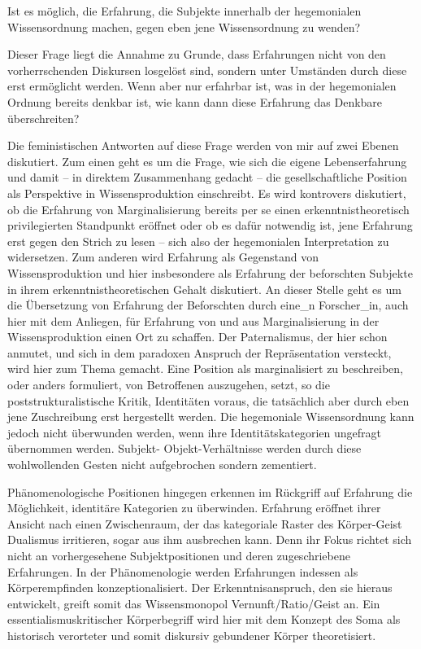 Ist es möglich, die Erfahrung, die Subjekte innerhalb der hegemonialen
Wissensordnung machen, gegen eben jene Wissensordnung zu wenden?

Dieser Frage
liegt die Annahme zu Grunde, dass Erfahrungen nicht von den vorherrschenden
Diskursen losgelöst sind, sondern unter Umständen durch diese erst ermöglicht
werden. Wenn aber nur erfahrbar ist, was in der hegemonialen Ordnung bereits
denkbar ist, wie kann dann diese Erfahrung das Denkbare überschreiten?

Die
feministischen Antworten auf diese Frage werden von mir auf zwei Ebenen
diskutiert. Zum einen geht es um die Frage, wie sich die eigene Lebenserfahrung
und damit – in direktem Zusammenhang gedacht – die gesellschaftliche Position
als Perspektive in Wissensproduktion einschreibt. Es wird kontrovers diskutiert,
ob die Erfahrung von Marginalisierung bereits per se einen erkenntnistheoretisch
privilegierten Standpunkt eröffnet oder ob es dafür notwendig ist, jene
Erfahrung erst gegen den Strich zu lesen – sich also der hegemonialen
Interpretation zu widersetzen. Zum anderen wird Erfahrung als Gegenstand von
Wissensproduktion und hier insbesondere als Erfahrung der beforschten Subjekte
in ihrem erkenntnistheoretischen Gehalt diskutiert. An dieser Stelle geht es um
die Übersetzung von Erfahrung der Beforschten durch eine\_n Forscher\_in, auch
hier mit dem Anliegen, für Erfahrung von und aus Marginalisierung in der
Wissensproduktion einen Ort zu schaffen. Der Paternalismus, der hier schon
anmutet, und sich in dem paradoxen Anspruch der Repräsentation versteckt, wird
hier zum Thema gemacht. Eine Position als marginalisiert zu beschreiben, oder
anders formuliert, von Betroffenen auszugehen, setzt, so die
poststrukturalistische Kritik, Identitäten voraus, die tatsächlich aber durch
eben jene Zuschreibung erst hergestellt werden. Die hegemoniale Wissensordnung
kann jedoch nicht überwunden werden, wenn ihre Identitätskategorien ungefragt
übernommen werden. Subjekt- Objekt-Verhältnisse werden durch diese wohlwollenden
Gesten nicht aufgebrochen sondern zementiert. 

Phänomenologische Positionen hingegen erkennen im Rückgriff auf Erfahrung die
Möglichkeit, identitäre Kategorien zu überwinden. Erfahrung eröffnet ihrer
Ansicht nach einen Zwischenraum, der das kategoriale Raster des Körper-Geist
Dualismus irritieren, sogar aus ihm ausbrechen kann. Denn ihr Fokus richtet sich
nicht an vorhergesehene Subjektpositionen und deren zugeschriebene Erfahrungen.
In der Phänomenologie werden Erfahrungen indessen als Körperempfinden
konzeptionalisiert. Der Erkenntnisanspruch, den sie hieraus entwickelt, greift
somit das Wissensmonopol Vernunft/Ratio/Geist an. Ein essentialismuskritischer
Körperbegriff wird hier mit dem Konzept des Soma als historisch verorteter und
somit diskursiv gebundener Körper theoretisiert.

